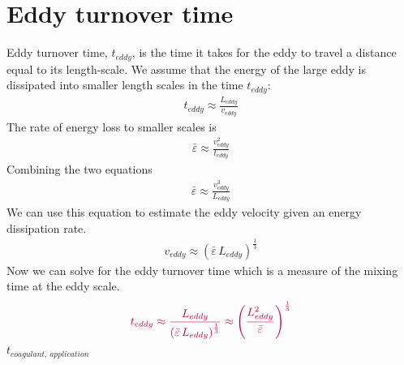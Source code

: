 \documentclass[letterpaper,10pt,english]{sphinxmanual}
\begin{document}
\section{Eddy turnover time}
\label{\detokenize{Rapid_Mix/RM_Derivations:eddy-turnover-time}}\label{\detokenize{Rapid_Mix/RM_Derivations:heading-eddy-turnover-time}}
Eddy turnover time, \(t_{eddy}\), is the time it takes for the eddy to travel a distance equal to its length-scale. We assume that the energy of the large eddy is dissipated into smaller length scales in the time \(t_{eddy}\):
\begin{equation}\label{equation:Rapid_Mix/RM_Derivations:Rapid_Mix/RM_Derivations:0}
\begin{split}t_{eddy} \approx \frac{L_{eddy}}{v_{eddy}}\end{split}
\end{equation}
The rate of energy loss to smaller scales is
\begin{equation}\label{equation:Rapid_Mix/RM_Derivations:Rapid_Mix/RM_Derivations:1}
\begin{split}\bar\varepsilon \approx\frac{v_{eddy}^2}{t_{eddy}}\end{split}
\end{equation}
Combining the two equations
\begin{equation}\label{equation:Rapid_Mix/RM_Derivations:Rapid_Mix/RM_Derivations:2}
\begin{split}\bar\varepsilon \approx\frac{v_{eddy}^3}{L_{eddy}}\end{split}
\end{equation}
We can use this equation to estimate the eddy velocity given an energy dissipation rate.
\begin{equation}\label{equation:Rapid_Mix/RM_Derivations:Rapid_Mix/RM_Derivations:3}
\begin{split}v_{eddy} \approx \left( \bar\varepsilon \, L_{eddy} \right)^\frac{1}{3}\end{split}
\end{equation}
Now we can solve for the eddy turnover time which is a measure of the mixing time at the eddy scale.
\begin{equation}\label{equation:Rapid_Mix/RM_Derivations:Rapid_Mix/RM_Derivations:4}
\begin{split}\color{purple}{
  t_{eddy} \approx \frac{L_{eddy}}{\left( \bar\varepsilon \, L_{eddy} \right)^\frac{1}{3}} \approx \left( \frac{L_{eddy}^2}{ \bar\varepsilon }\right)^\frac{1}{3}
}\end{split}
\end{equation}
\(t_{coagulant, \, application}\)
\end{document}
